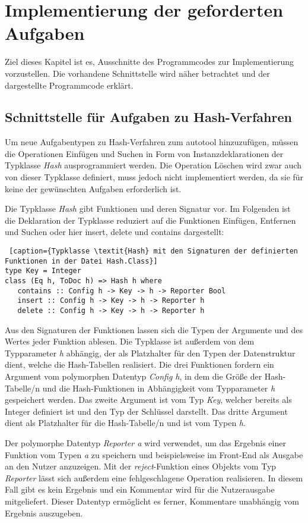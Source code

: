 \chapter{Implementierung der geforderten Aufgaben}\label{ch5}
Ziel dieses Kapitel ist es, Ausschnitte des Programmcodes zur Implementierung vorzustellen. Die vorhandene Schnittstelle wird näher betrachtet und der dargestellte Programmcode erklärt.

\section{Schnittstelle für Aufgaben zu Hash-Verfahren}\label{schnittstelle}
Um neue Aufgabentypen zu Hash-Verfahren zum autotool hinzuzufügen, müssen die Operationen Einfügen und Suchen in Form von Instanzdeklarationen der Typklasse \textit{Hash} ausprogrammiert werden. Die Operation Löschen wird zwar auch von dieser Typklasse definiert, muss jedoch nicht implementiert werden, da sie für keine der gewünschten Aufgaben erforderlich ist. 

Die Typklasse \textit{Hash} gibt Funktionen und deren Signatur vor. Im Folgenden ist die Deklaration der Typklasse reduziert auf die Funktionen Einfügen, Entfernen und Suchen oder hier insert, delete und contains dargestellt:
\begin{lstlisting} [caption={Typklasse \textit{Hash} mit den Signaturen der definierten Funktionen in der Datei Hash.Class}]
type Key = Integer
class (Eq h, ToDoc h) => Hash h where
   contains :: Config h -> Key -> h -> Reporter Bool
   insert :: Config h -> Key -> h -> Reporter h
   delete :: Config h -> Key -> h -> Reporter h
\end{lstlisting}
Aus den Signaturen der Funktionen lassen sich die Typen der Argumente und des Wertes jeder Funktion ablesen. Die Typklasse ist außerdem von dem Typparameter \textit{h} abhängig, der als Platzhalter für den Typen der Datenstruktur dient, welche die Hash-Tabellen realisiert. Die drei Funktionen fordern ein Argument vom polymorphen Datentyp \textit{Config h}, in dem die Größe der Hash-Tabelle/n und die Hash-Funktionen in Abhängigkeit vom Typparameter \textit{h} gespeichert werden. Das zweite Argument ist vom Typ \textit{Key}, welcher bereits als Integer definiert ist und den Typ der Schlüssel darstellt. Das dritte Argument dient als Platzhalter für die Hash-Tabelle/n und ist vom Typen \textit{h}. 

Der polymorphe Datentyp \textit{Reporter a} wird verwendet, um das Ergebnis einer Funktion vom Typen \textit{a} zu speichern und beispielsweise im Front-End als Ausgabe an den Nutzer anzuzeigen. Mit der \textit{reject}-Funktion eines Objekts vom Typ \textit{Reporter} lässt sich außerdem eine fehlgeschlagene Operation realisieren. In diesem Fall gibt es kein Ergebnis und ein Kommentar wird für die Nutzerausgabe mitgeliefert. Dieser Datentyp ermöglicht es ferner, Kommentare unabhängig vom Ergebnis auszugeben. 

